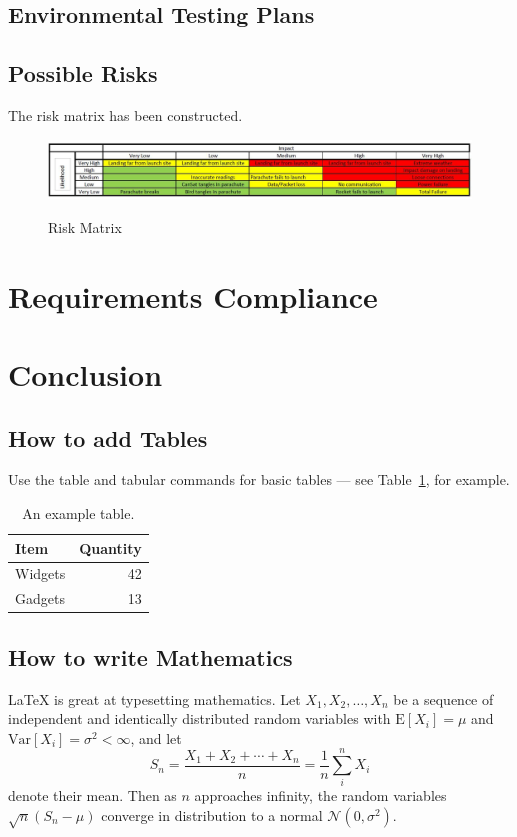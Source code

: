 \documentclass[10pt, a4paper]{article}
\begin{document}
\subsection{Environmental Testing Plans}
\subsection{Possible Risks}
The risk matrix has been constructed.
\begin{figure}[H]
\centering
\includegraphics[scale =0.4]{risk.JPG}
\label{fig:risk}
\caption{Risk Matrix}
\end{figure}

\newpage

\section{Requirements Compliance}

\section{Conclusion}




\subsection{How to add Tables}

Use the table and tabular commands for basic tables --- see Table~\ref{tab:widgets}, for example. 

\begin{table}
\centering
\begin{tabular}{l|r}
Item & Quantity \\\hline
Widgets & 42 \\
Gadgets & 13
\end{tabular}
\caption{\label{tab:widgets}An example table.}
\end{table}

\subsection{How to write Mathematics}

\LaTeX{} is great at typesetting mathematics. Let $X_1, X_2, \ldots, X_n$ be a sequence of independent and identically distributed random variables with $\text{E}[X_i] = \mu$ and $\text{Var}[X_i] = \sigma^2 < \infty$, and let
\[S_n = \frac{X_1 + X_2 + \cdots + X_n}{n}
      = \frac{1}{n}\sum_{i}^{n} X_i\]
denote their mean. Then as $n$ approaches infinity, the random variables $\sqrt{n}(S_n - \mu)$ converge in distribution to a normal $\mathcal{N}(0, \sigma^2)$.
\end{document}
